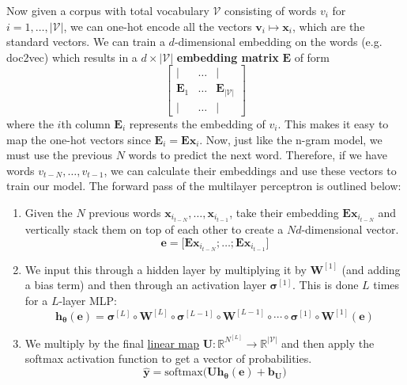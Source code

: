 \documentclass{article}
\begin{document}
    Now given a corpus with total vocabulary $\mathcal{V}$ consisting of words $v_i$ for $i = 1, \ldots, |\mathcal{V}|$, we can one-hot encode all the vectors $\mathbf{v}_i \mapsto \mathbf{x}_i$, which are the standard vectors. We can train a $d$-dimensional embedding on the words (e.g. doc2vec) which results in a $d \times |\mathcal{V}|$ \textbf{embedding matrix} $\mathbf{E}$ of form 
    \begin{equation}
      \begin{bmatrix} | & \ldots & | \\ \mathbf{E}_1 & \ldots & \mathbf{E}_{|\mathcal{V}|} \\ | & \ldots & | \end{bmatrix}
    \end{equation}
    where the $i$th column $\mathbf{E}_i$ represents the embedding of $v_i$. This makes it easy to map the one-hot vectors since $\mathbf{E}_i = \mathbf{E} \mathbf{x}_i$. Now, just like the n-gram model, we must use the previous $N$ words to predict the next word. Therefore, if we have words $v_{t - N}, \ldots, v_{t-1}$, we can calculate their embeddings and use these vectors to train our model. The forward pass of the multilayer perceptron is outlined below: 
    \begin{enumerate}
        \item Given the $N$ previous words $\mathbf{x}_{i_{t-N}}, \ldots, \mathbf{x}_{i_{t-1}}$, take their embedding $\mathbf{E} \mathbf{x}_{i_{t-N}}$ and vertically stack them on top of each other to create a $Nd$-dimensional vector. 
        \begin{equation}
          \mathbf{e} = \big[ \mathbf{E} \mathbf{x}_{i_{t-N}} ; \ldots ; \mathbf{E} \mathbf{x}_{i_{t-1}} \big]
        \end{equation}

        \item We input this through a hidden layer by multiplying it by $\mathbf{W}^{[1]}$ (and adding a bias term) and then through an activation layer $\boldsymbol{\sigma}^{[1]}$. This is done $L$ times for a $L$-layer MLP: 
        \begin{equation}
          \mathbf{h}_{\boldsymbol{\theta}} (\mathbf{e}) = \boldsymbol{\sigma}^{[L]} \circ \mathbf{W}^{[L]} \circ \boldsymbol{\sigma}^{[L-1]} \circ \mathbf{W}^{[L-1]} \circ \cdots \circ \boldsymbol{\sigma}^{[1]} \circ \mathbf{W}^{[1]} (\mathbf{e})
        \end{equation}

        \item We multiply by the final \hyperref[lin-def:linear_map]{linear map} $\mathbf{U}: \mathbb{R}^{N^{[L]}} \rightarrow \mathbb{R}^{|\mathcal{V}|}$ and then apply the softmax activation function to get a vector of probabilities. 
        \begin{equation}
          \hat{\mathbf{y}} = \mathrm{softmax} \big( \mathbf{U} \mathbf{h}_{\boldsymbol{\theta}} (\mathbf{e}) + \mathbf{b}_\mathbf{U} \big)
        \end{equation}
    \end{enumerate}
\end{document}
